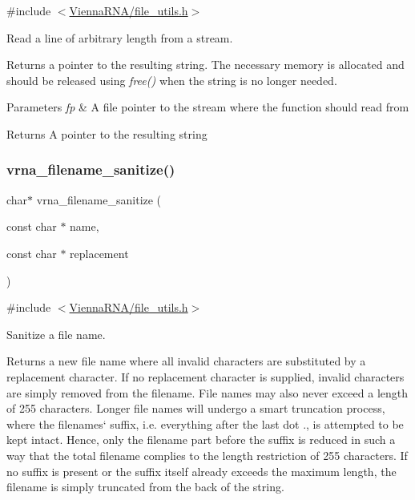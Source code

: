 {\ttfamily \#include $<$\hyperlink{file__utils_8h}{Vienna\+R\+N\+A/file\+\_\+utils.\+h}$>$}



Read a line of arbitrary length from a stream. 

Returns a pointer to the resulting string. The necessary memory is allocated and should be released using {\itshape free()} when the string is no longer needed.


\begin{DoxyParams}{Parameters}
{\em fp} & A file pointer to the stream where the function should read from \\
\hline
\end{DoxyParams}
\begin{DoxyReturn}{Returns}
A pointer to the resulting string 
\end{DoxyReturn}
\mbox{\label{group__file__utils_ga72eae0a472bad905b6facccf5b453a76}} 
\subsubsection{\texorpdfstring{vrna\+\_\+filename\+\_\+sanitize()}{vrna\_filename\_sanitize()}}
{\footnotesize\ttfamily char$\ast$ vrna\+\_\+filename\+\_\+sanitize (\begin{DoxyParamCaption}\item[{const char $\ast$}]{name,  }\item[{const char $\ast$}]{replacement }\end{DoxyParamCaption})}



{\ttfamily \#include $<$\hyperlink{file__utils_8h}{Vienna\+R\+N\+A/file\+\_\+utils.\+h}$>$}



Sanitize a file name. 

Returns a new file name where all invalid characters are substituted by a replacement character. If no replacement character is supplied, invalid characters are simply removed from the filename. File names may also never exceed a length of 255 characters. Longer file names will undergo a \textquotesingle{}smart\textquotesingle{} truncation process, where the filenames` suffix, i.\+e. everything after the last dot \textquotesingle{}.\textquotesingle{}, is attempted to be kept intact. Hence, only the filename part before the suffix is reduced in such a way that the total filename complies to the length restriction of 255 characters. If no suffix is present or the suffix itself already exceeds the maximum length, the filename is simply truncated from the back of the string.

